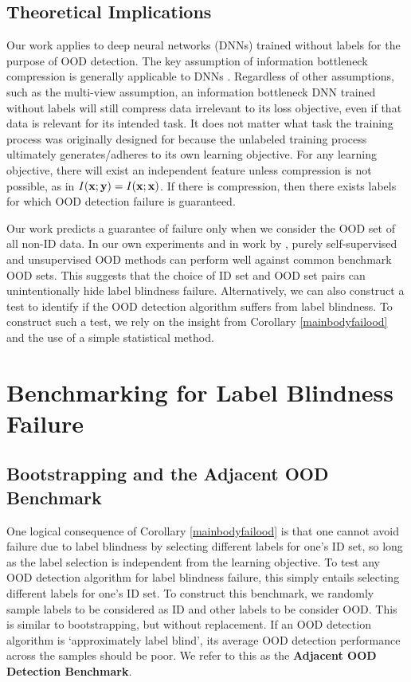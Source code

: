 \documentclass[11pt, oneside]{book}
\theoremstyle{plain}
\theoremstyle{definition}
\theoremstyle{remark}
\begin{document}
\subsection{Theoretical Implications}

Our work applies to deep neural networks (DNNs) trained without labels for the purpose of OOD detection. The key assumption of information bottleneck compression is generally applicable to DNNs \citep{shwartz2017opening}. Regardless of other assumptions, such as the multi-view assumption, an information bottleneck DNN trained without labels will still compress data irrelevant to its loss objective, even if that data is relevant for its intended task. It does not matter what task the training process was originally designed for because the unlabeled training process ultimately generates/adheres to its own learning objective. For any learning objective, there will exist an independent feature unless compression is not possible, as in $I({\mathbf{x}};{\mathbf{y}}) = I({\mathbf{x}};{\mathbf{x}})$. If there is compression, then there exists labels for which OOD detection failure is guaranteed.

Our work predicts a guarantee of failure only when we consider the OOD set of all non-ID data. In our own experiments and in work by \citet{sehwag2021ssd, hendrycks2019using, liu2023unsupervised}, purely self-supervised and unsupervised OOD methods can perform well against common benchmark OOD sets. This suggests that the choice of ID set and OOD set pairs can unintentionally hide label blindness failure. Alternatively, we can also construct a test to identify if the OOD detection algorithm suffers from label blindness. To construct such a test, we rely on the insight from Corollary \ref{mainbodyfailood} and the use of a simple statistical method.

\section{Benchmarking for Label Blindness Failure}

\subsection{Bootstrapping and the Adjacent OOD Benchmark}

One logical consequence of Corollary \ref{mainbodyfailood} is that one cannot avoid failure due to label blindness by selecting different labels for one's ID set, so long as the label selection is independent from the learning objective. To test any OOD detection algorithm for label blindness failure, this simply entails selecting different labels for one's ID set. To construct this benchmark, we randomly sample labels to be considered as ID and other labels to be consider OOD. This is similar to bootstrapping, but without replacement. If an OOD detection algorithm is `approximately label blind', its average OOD detection performance across the samples should be poor. We refer to this as the \textbf{Adjacent OOD Detection Benchmark}.
\end{document}
